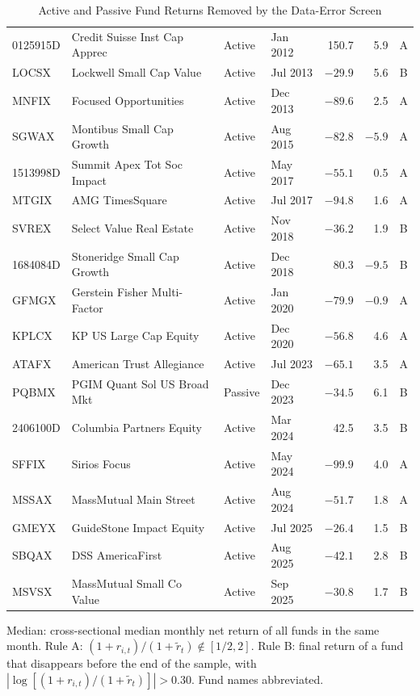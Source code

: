 \documentclass[12pt, oneside]{report}
\newlength{\sbeshrink}
\newif\ifsbemore
\newcommand{\sbefitstep}{%
  \sbemorefalse
  \ifdim\wd\tabletempbox>\linewidth\ifdim\sbeshrink<3pt\sbemoretrue\fi\fi
  \ifsbemore
    \addtolength{\sbeshrink}{0.25pt}\sbox{\tabletempbox}{\sbetab}%
    \expandafter\sbefitstep
  \fi}
\newcommand{\sbefit}{%
  \setlength{\sbeshrink}{0pt}\sbox{\tabletempbox}{\sbetab}%
  \sbefitstep
  \setlength{\sbeshrink}{0pt}}
\newlength{\tabletempwidth}
\newcommand{\tablefont}{\fontsize{9}{11}\selectfont}  %
\begin{document}
\begin{table}[!htbp]
{\begin{tabular}{llllrrc}
0125915D & Credit Suisse Inst Cap Apprec & Active & Jan 2012 & 150.7 & 5.9 & A \\
LOCSX & Lockwell Small Cap Value & Active & Jul 2013 & $-29.9$ & 5.6 & B \\
MNFIX & Focused Opportunities & Active & Dec 2013 & $-89.6$ & 2.5 & A \\
SGWAX & Montibus Small Cap Growth & Active & Aug 2015 & $-82.8$ & $-5.9$ & A \\
1513998D & Summit Apex Tot Soc Impact & Active & May 2017 & $-55.1$ & 0.5 & A \\
MTGIX & AMG TimesSquare & Active & Jul 2017 & $-94.8$ & 1.6 & A \\
SVREX & Select Value Real Estate & Active & Nov 2018 & $-36.2$ & 1.9 & B \\
1684084D & Stoneridge Small Cap Growth & Active & Dec 2018 & 80.3 & $-9.5$ & B \\
GFMGX & Gerstein Fisher Multi-Factor & Active & Jan 2020 & $-79.9$ & $-0.9$ & A \\
KPLCX & KP US Large Cap Equity & Active & Dec 2020 & $-56.8$ & 4.6 & A \\
ATAFX & American Trust Allegiance & Active & Jul 2023 & $-65.1$ & 3.5 & A \\
PQBMX & PGIM Quant Sol US Broad Mkt & Passive & Dec 2023 & $-34.5$ & 6.1 & B \\
2406100D & Columbia Partners Equity & Active & Mar 2024 & 42.5 & 3.5 & B \\
SFFIX & Sirios Focus & Active & May 2024 & $-99.9$ & 4.0 & A \\
MSSAX & MassMutual Main Street & Active & Aug 2024 & $-51.7$ & 1.8 & A \\
GMEYX & GuideStone Impact Equity & Active & Jul 2025 & $-26.4$ & 1.5 & B \\
SBQAX & DSS AmericaFirst & Active & Aug 2025 & $-42.1$ & 2.8 & B \\
MSVSX & MassMutual Small Co Value & Active & Sep 2025 & $-30.8$ & 1.7 & B \\
\bottomrule
\end{tabular}%
}\sbefit
\setlength{\tabletempwidth}{\wd\tabletempbox}
\ifdim\tabletempwidth>\linewidth\setlength{\tabletempwidth}{\linewidth}\fi
\begin{minipage}{\tabletempwidth}
\captionsetup{width=\linewidth}
\caption{Active and Passive Fund Returns Removed by the Data-Error Screen}\label{tab:k_screen}
\ifdim\wd\tabletempbox>\linewidth
  \resizebox{\linewidth}{!}{\usebox{\tabletempbox}}
\else
  \usebox{\tabletempbox}
\fi
\par\medskip
\begin{singlespace}\tablefont\noindent
Median: cross-sectional median monthly net return of all funds in the same
month. Rule A: $(1+r_{i,t})/(1+\tilde{r}_t) \notin [1/2, 2]$. Rule B: final return of a
fund that disappears before the end of the sample, with
$|\log[(1+r_{i,t})/(1+\tilde{r}_t)]| > 0.30$. Fund names abbreviated.
\end{singlespace}
\end{minipage}
\end{table}
\end{document}
